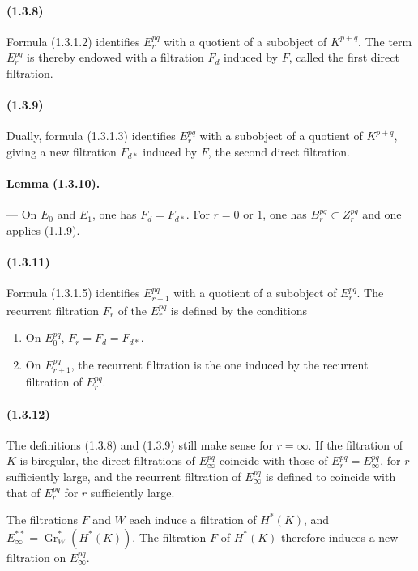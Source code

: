 \documentclass[10pt]{article}
\newcommand{\Gr}{\operatorname{Gr}}
\begin{document}
\paragraph{(1.3.8)} Formula (1.3.1.2) identifies $E_r^{pq}$ with a quotient of a subobject of $K^{p+q}$. The term $E_r^{pq}$ is thereby endowed with a filtration $F_d$ induced by $F$, called the first direct filtration.

\paragraph{(1.3.9)} Dually, formula (1.3.1.3) identifies $E_r^{pq}$ with a subobject of a quotient of $K^{p+q}$, giving a new filtration $F_{d*}$ induced by $F$, the second direct filtration.

\paragraph{Lemma (1.3.10).} --- On $E_0$ and $E_1$, one has $F_d=F_{d*}$. For $r=0$ or $1$, one has $B_r^{pq}\subset Z_r^{pq}$ and one applies (1.1.9).

\paragraph{(1.3.11)} Formula (1.3.1.5) identifies $E_{r+1}^{pq}$ with a quotient of a subobject of $E_r^{pq}$. The recurrent filtration $F_r$ of the $E_r^{pq}$ is defined by the conditions
\begin{enumerate}[label=(\roman*)]
\item On $E_0^{pq}$, $F_r=F_d=F_{d*}$.
\item On $E_{r+1}^{pq}$, the recurrent filtration is the one induced by the recurrent filtration of $E_r^{pq}$.
\end{enumerate}

\paragraph{(1.3.12)} The definitions (1.3.8) and (1.3.9) still make sense for $r=\infty$. If the filtration of $K$ is biregular, the direct filtrations of $E_\infty^{pq}$ coincide with those of $E_r^{pq}=E_\infty^{pq}$, for $r$ sufficiently large, and the recurrent filtration of $E_\infty^{pq}$ is defined to coincide with that of $E_r^{pq}$ for $r$ sufficiently large.

The filtrations $F$ and $W$ each induce a filtration of $H^*(K)$, and $E_\infty^{**}=\Gr_W^*(H^*(K))$. The filtration $F$ of $H^*(K)$ therefore induces a new filtration on $E_\infty^{pq}$.
\end{document}
